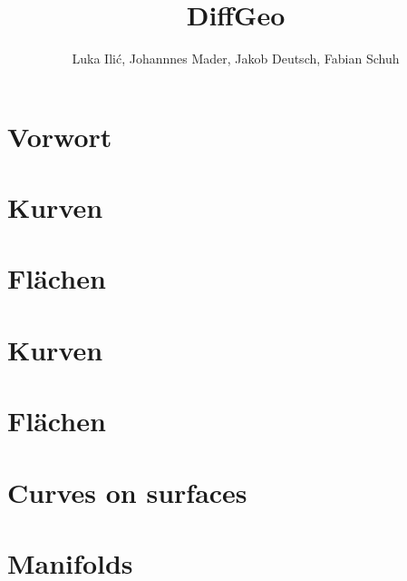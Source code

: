 \documentclass[a4paper,oneside,11pt,DIV=12,parskip=half]{scrartcl}
\title{DiffGeo}
\author{ Luka Ili\'{c}, Johannnes Mader, Jakob Deutsch, Fabian Schuh}
\theoremstyle{plain}
\theoremstyle{definition}
\newtheorem{remark, definition}[theorem]{Bemerkung und Definition.}
\newtheorem{lemma, definition}[theorem]{Lemma und Definition.}
\newtheorem{theorem, definition}[theorem]{Satz und Definition.}
\theoremstyle{remark}
\newtheorem*{remark, example}{\textbf{Bemerkung und Beispiel}}
\begin{document}
\maketitle

\pagebreak

\tableofcontents

\pagebreak

\section*{Vorwort}

\pagebreak

\section{Kurven}

\pagebreak

\section{Flächen}

\pagebreak

\section{Kurven}

\pagebreak

\section{Flächen}

\pagebreak


\section{Curves on surfaces}

\pagebreak

\section{Manifolds}

\pagebreak
\end{document}
